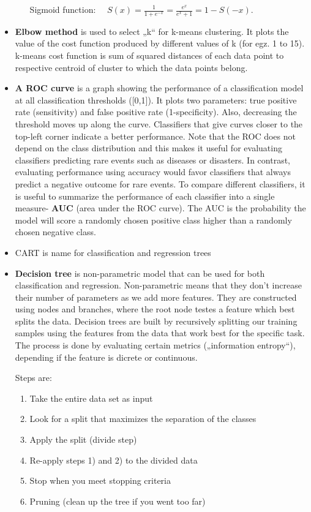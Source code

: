 \documentclass[
  letterpaper,
]{book}
\providecommand{\tightlist}{%
  \setlength{\itemsep}{0pt}\setlength{\parskip}{0pt}}\usepackage{longtable,booktabs,array}
\begin{document}
\begin{itemize}
\begin{itemize}
    Sigmoid function:
    \(\quad S(x) = \frac{1}{1 + e^{-x}} = \frac{e^{x}}{e^{x} + 1} = 1 - S(-x).\)
  \end{itemize}
\item
  \textbf{Elbow method} is used to select „k`` for k-means clustering.
  It plots the value of the cost function produced by different values
  of k (for egz. 1 to 15). k-means cost function is sum of squared
  distances of each data point to respective centroid of cluster to
  which the data points belong.
\item
  \textbf{A ROC curve} is a graph showing the performance of a
  classification model at all classification thresholds ({[}0,1{]}). It
  plots two parameters: true positive rate (sensitivity) and false
  positive rate (1-specificity). Also, decreasing the threshold moves up
  along the curve. Classifiers that give curves closer to the top-left
  corner indicate a better performance. Note that the ROC does not
  depend on the class distribution and this makes it useful for
  evaluating classifiers predicting rare events such as diseases or
  disasters. In contrast, evaluating performance using accuracy would
  favor classifiers that always predict a negative outcome for rare
  events. To compare different classifiers, it is useful to summarize
  the performance of each classifier into a single measure- \textbf{AUC}
  (area under the ROC curve). The AUC is the probability the model will
  score a randomly chosen positive class higher than a randomly chosen
  negative class.
\item
  CART is name for classification and regression trees
\item
  \textbf{Decision tree} is non-parametric model that can be used for
  both classification and regression. Non-parametric means that they
  don't increase their number of parameters as we add more features.
  They are constructed using nodes and branches, where the root node
  testes a feature which best splits the data. Decision trees are built
  by recursively splitting our training samples using the features from
  the data that work best for the specific task. The process is done by
  evaluating certain metrics („information entropy``), depending if the
  feature is dicrete or continuous.

  Steps are:

  \begin{enumerate}
  \def\labelenumi{\arabic{enumi}.}
  \tightlist
  \item
    Take the entire data set as input
  \item
    Look for a split that maximizes the separation of the classes
  \item
    Apply the split (divide step)
  \item
    Re-apply steps 1) and 2) to the divided data
  \item
    Stop when you meet stopping criteria
  \item
    Pruning (clean up the tree if you went too far)
  \end{enumerate}


\end{itemize}
\end{document}
